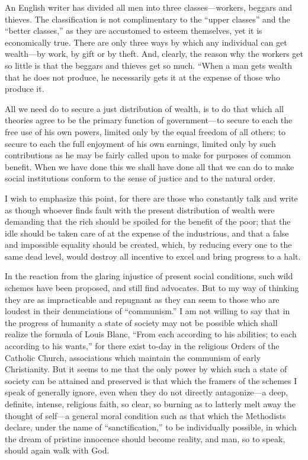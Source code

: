 \documentclass{book}
\begin{document}
An English writer has divided all men into three classes—workers, beggars and thieves. The classification is not complimentary to the “upper classes” and the “better classes,” as they are accustomed to esteem themselves, yet it is economically true. There are only three ways by which any individual can get wealth—by work, by gift or by theft. And, clearly, the reason why the workers get so little is that the beggars and thieves get so much. “When a man gets wealth that he does not produce, he necessarily gets it at the expense of those who produce it.

All we need do to secure a just distribution of wealth, is to do that which all theories agree to be the primary function of government—to secure to each the free use of his own powers, limited only by the equal freedom of all others; to secure to each the full enjoyment of his own earnings, limited only by such contributions as he may be fairly called upon to make for purposes of common benefit. When we have done this we shall have done all that we can do to make social institutions conform to the sense of justice and to the natural order.

I wish to emphasize this point, for there are those who constantly talk and write as though whoever finds fault with the present distribution of wealth were demanding that the rich should be spoiled for the benefit of the poor; that the idle should be taken care of at the expense of the industrious, and that a false and impossible equality should be created, which, by reducing every one to the same dead level, would destroy all incentive to excel and bring progress to a halt.

In the reaction from the glaring injustice of present social conditions, such wild schemes have been proposed, and still find advocates. But to my way of thinking they are as impracticable and repugnant as they can seem to those who are loudest in their denunciations of “communism.” I am not willing to say that in the progress of humanity a state of society may not be possible which shall realize the formula of Louis Blanc, “From each according to his abilities; to each according to his wants,” for there exist to-day in the religious Orders of the Catholic Church, associations which maintain the communism of early Christianity. But it seems to me that the only power by which such a state of society can be attained and preserved is that which the framers of the schemes I speak of generally ignore, even when they do not directly antagonize—a deep, definite, intense, religious faith, so clear, so burning as to latterly melt away the thought of self—a general moral condition such as that which the Methodists declare, under the name of “sanctification,” to be individually possible, in which the dream of pristine innocence should become reality, and man, so to speak, should again walk with God.
\end{document}
